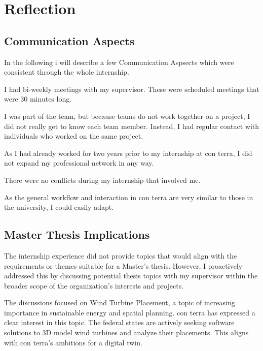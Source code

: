 \documentclass[11pt, titlepage, a4paper]{article}
\begin{document}
\section{Reflection}

 \subsection{Communication Aspects}
In the following i will describe a few Communication Aspsects which were consistent through the whole internship.
 \begin{description}[]
     \item[Supervisor Communication:] I had bi-weekly meetings with my supervisor. These were scheduled meetings that were 30 minutes long.
     \item[Teamwork:] I was part of the team, but because teams do not work together on a project, I did not really get to know each team member. Instead, I had regular contact with individuals who worked on the same project. 
     \item[Professional Network:] As I had already worked for two years prior to my internship at con terra, I did not expand my professional network in any way.
     \item[Conflicts:] There were no conflicts during my internship that involved me.
      \item[Applied Communication Skills:]  As the general workflow and interaction in con terra are very similar to those in the university, I could easily adapt.
\end{description}

\subsection{Master Thesis Implications}
The internship experience did not provide topics that would align with the requirements or themes suitable for a Master's thesis. However, I proactively addressed this by discussing potential thesis topics with my supervisor within the broader scope of the organization's interests and projects.

The discussions focused on Wind Turbine Placement, a topic of increasing importance in sustainable energy and spatial planning. con terra has expressed a clear interest in this topic. The federal states are actively seeking software solutions to 3D model wind turbines and analyze their placements. This aligns with con terra's ambitions for a digital twin.
\end{document}
